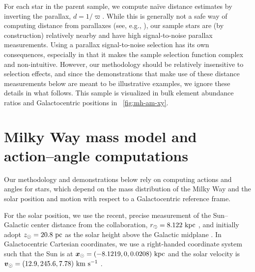 \documentclass[modern]{aastex63}
\begin{document}
For each star in the parent sample, we compute na\"ive distance estimates by
inverting the parallax, $d = 1/\varpi$.
While this is generally not a safe way of computing distance from parallaxes
(see, e.g., \citealt{Bailer-Jones:2015}), our sample stars are (by construction)
relatively nearby and have high signal-to-noise parallax measurements.
Using a parallax signal-to-noise selection has its own consequences, especially
in that it makes the sample selection function complex and non-intuitive.
However, our methodology should be relatively insensitive to selection effects,
and since the demonstrations that make use of these distance measurements below
are meant to be illustrative examples, we ignore these details in what follows.
This sample is visualized in bulk element abundance ratios and Galactocentric
positions in \figurename~\ref{fig:mh-am-xy}.


\section{Milky Way mass model and action--angle computations}
\label{sec:mw-model}

Our methodology and demonstrations below rely on computing actions and angles
for stars, which depend on the mass distribution of the Milky Way and the solar
position and motion with respect to a Galactocentric reference frame.

For the solar position, we use the recent, precise measurement of the
Sun--Galactic center distance from the  collaboration, $r_\odot
= 8.122~\mathrm{kpc}$ \citep{Gravity:2018}, and initially adopt $z_\odot = 20.8~\mathrm{pc}$ as
the solar height above the Galactic midplane \citep{Bennett:2019}.
In Galactocentric Cartesian coordinates, we use a right-handed coordinate system
such that the Sun is at $\boldsymbol{x}_\odot = (-8.1219, 0, 0.0208)~\mathrm{kpc}$ and the
solar velocity is $\boldsymbol{v}_\odot = (12.9, 245.6, 7.78)~\mathrm{km}~\mathrm{s}^{-1}$ \citep{Drimmel:2018,
Reid:2004, Gravity:2018}.
\end{document}

